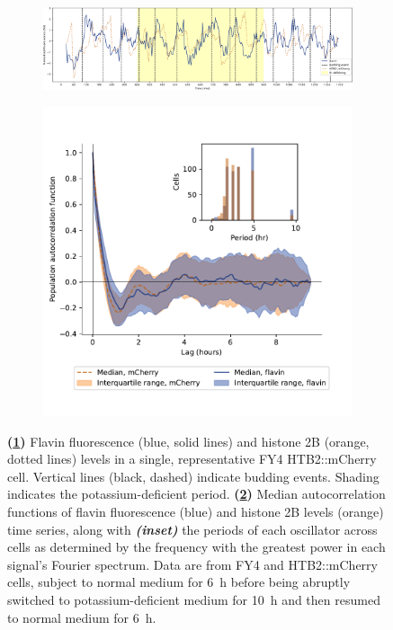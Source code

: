 \begin{figure}
  \centering
  \begin{subfigure}[htpb]{1.0\textwidth}
   \centering
   \includegraphics[width=\textwidth]{htb2mCherry_613_plots_single_htb2mCherry012_90_2_adapted.pdf}
   \caption{
   }
   \label{fig:biology-kdeficient-single}
  \end{subfigure}

  \begin{subfigure}[htpb]{0.7\textwidth}
   \centering
   \includegraphics[width=\textwidth]{htb2mCherry_613_12.pdf}
   \caption{
   }
   \label{fig:biology-kdeficient-acf}
  \end{subfigure}

  \caption{
    \textbf{(\ref{fig:biology-kdeficient-single})}
    Flavin fluorescence (blue, solid lines) and histone 2B (orange, dotted lines) levels in a single, representative FY4 HTB2::mCherry cell.
    Vertical lines (black, dashed) indicate budding events.
    Shading indicates the potassium-deficient period.
    \textbf{(\ref{fig:biology-kdeficient-acf})}
    Median autocorrelation functions of flavin fluorescence (blue) and histone 2B levels (orange) time series, along with \textit{\textbf{(inset)}} the periods of each oscillator across cells as determined by the frequency with the greatest power in each signal's Fourier spectrum.
    Data are from FY4 and HTB2::mCherry cells, subject to normal medium for \SI{6}{\hour} before being abruptly switched to potassium-deficient medium for \SI{10}{\hour} and then resumed to normal medium for \SI{6}{\hour}.
  }
  \label{fig:biology-kdeficient}
\end{figure}



